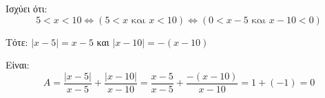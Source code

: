 
\begin{alist}
\item Ισχύει ότι:
\[5 < x < 10 \Leftrightarrow (5 < x \text{ και } x < 10) \Leftrightarrow (0 < x - 5 \text{ και } x - 10 < 0)\]

Τότε:
$|x - 5| = x - 5$ και $|x - 10| = -(x - 10)$

\item Είναι:
\[A = \dfrac{|x - 5|}{x - 5} + \dfrac{|x - 10|}{x - 10} = \dfrac{x - 5}{x - 5} + \dfrac{-(x - 10)}{x - 10} = 1 + (-1) = 0\]
\end{alist}

